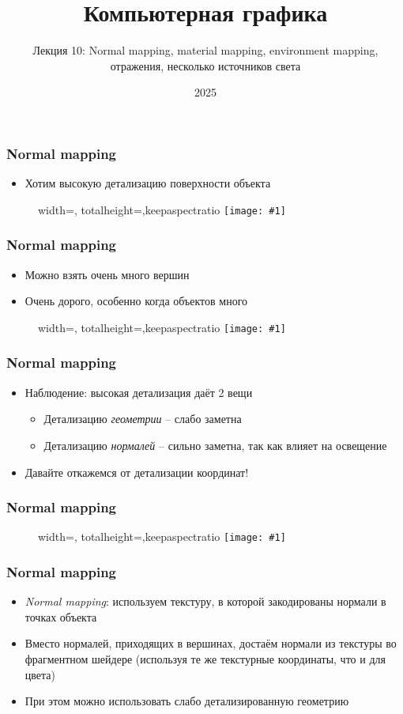 \documentclass[10pt]{beamer}
\title{Компьютерная графика}
\subtitle{Лекция 10: Normal mapping, material mapping, environment mapping, отражения, несколько источников света}
\date{2025}
\newcommand{\slideimage}[1]{
  \begin{figure}
    \begin{adjustbox}{width=\textwidth, totalheight=\textheight-2\baselineskip-2\baselineskip,keepaspectratio}
      \texttt{[image: \#1]}
    \end{adjustbox}
  \end{figure}
}
\begin{document}
\frame{\titlepage}

\begin{frame}[fragile]
\frametitle{Normal mapping}
\begin{itemize}
\item Хотим высокую детализацию поверхности объекта
\end{itemize}
\slideimage{orange.png}
\end{frame}

\begin{frame}[fragile]
\frametitle{Normal mapping}
\begin{itemize}
\item Можно взять очень много вершин
\pause
\item Очень дорого, особенно когда объектов много
\end{itemize}
\slideimage{orange-mesh.png}
\end{frame}

\begin{frame}[fragile]
\frametitle{Normal mapping}
\begin{itemize}
\item Наблюдение: высокая детализация даёт 2 вещи
\begin{itemize}
\item Детализацию \textit{геометрии} -- слабо заметна
\item Детализацию \textit{нормалей} -- сильно заметна, так как влияет на освещение
\end{itemize}
\pause
\item Давайте откажемся от детализации координат!
\end{itemize}
\end{frame}

\begin{frame}[fragile]
\frametitle{Normal mapping}
\slideimage{orange-normal-map.png}
\end{frame}

\begin{frame}[fragile]
\frametitle{Normal mapping}
\begin{itemize}
\item \textit{Normal mapping}: используем текстуру, в которой закодированы нормали в точках объекта
\pause
\item Вместо нормалей, приходящих в вершинах, достаём нормали из текстуры во фрагментном шейдере (используя те же текстурные координаты, что и для цвета)
\pause
\item При этом можно использовать слабо детализированную геометрию
\end{itemize}
\end{frame}
\end{document}
